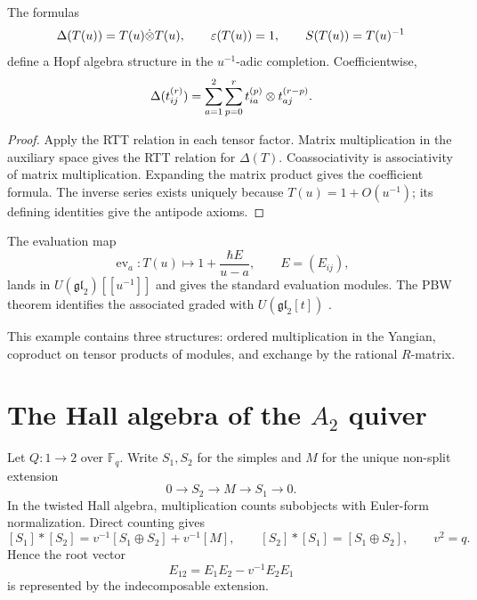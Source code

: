 \begin{theorem}
The formulas
\[
 \Delta(T(u))=T(u)\dot{\otimes} T(u),\qquad
 \varepsilon(T(u))=1,\qquad
 S(T(u))=T(u)^{-1}
\]
define a Hopf algebra structure in the $u^{-1}$-adic completion. Coefficientwise,
\[
 \Delta(t_{ij}^{(r)})
 =\sum_{a=1}^{2}\sum_{p=0}^{r}
 t_{ia}^{(p)}\otimes t_{aj}^{(r-p)}.
\]
\end{theorem}
\begin{proof}
Apply the RTT relation in each tensor factor. Matrix multiplication in the auxiliary space gives the RTT relation for $\Delta(T)$. Coassociativity is associativity of matrix multiplication. Expanding the matrix product gives the coefficient formula. The inverse series exists uniquely because $T(u)=1+O(u^{-1})$; its defining identities give the antipode axioms.
\end{proof}

The evaluation map
\[
 \operatorname{ev}_a:T(u)\longmapsto 1+\frac{\hbar E}{u-a},
 \qquad E=(E_{ij}),
\]
lands in $U(\mathfrak{gl}_2)[[u^{-1}]]$ and gives the standard evaluation modules. The PBW theorem identifies the associated graded with $U(\mathfrak{gl}_2[t])$ \cite{Molev,DrinfeldYangian}.

This example contains three structures: ordered multiplication in the Yangian, coproduct on tensor products of modules, and exchange by the rational $R$-matrix.

\chapter{The Hall algebra of the \texorpdfstring{$A_2$}{A2} quiver}
Let $Q:1\to2$ over $\mathbb F_q$. Write $S_1,S_2$ for the simples and $M$ for the unique non-split extension
\[
 0\to S_2\to M\to S_1\to0.
\]
In the twisted Hall algebra, multiplication counts subobjects with Euler-form normalization. Direct counting gives
\[
 [S_1]*[S_2]=v^{-1}[S_1\oplus S_2]+v^{-1}[M],
 \qquad
 [S_2]*[S_1]=[S_1\oplus S_2],
 \qquad v^2=q.
\]
Hence the root vector
\[
 E_{12}=E_1E_2-v^{-1}E_2E_1
\]
is represented by the indecomposable extension.


